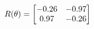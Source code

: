 \documentclass[preview]{standalone}
\begin{document}
\begin{align*}
\special{dvisvgm:raw <g id='unique000'>}R(\theta) = \begin{bmatrix}-0.26 & -0.97\\0.97 & -0.26\end{bmatrix}\special{dvisvgm:raw </g>}
\end{align*}
\end{document}

